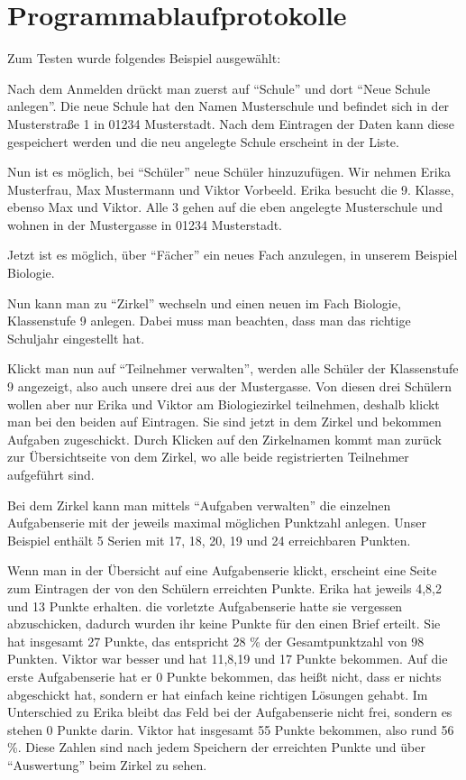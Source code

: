 \chapter{Programmablaufprotokolle}

Zum Testen wurde folgendes Beispiel ausgewählt:

Nach dem Anmelden drückt man zuerst auf "`Schule"' und dort "`Neue Schule anlegen"'. Die neue Schule hat den Namen Musterschule und befindet sich in der Musterstraße 1 in 01234 Musterstadt. Nach dem Eintragen der Daten kann diese gespeichert werden und die neu angelegte Schule erscheint in der Liste. 

Nun ist es möglich, bei "`Schüler"' neue Schüler hinzuzufügen. Wir nehmen Erika Musterfrau, Max Mustermann und Viktor Vorbeeld. Erika besucht die 9. Klasse, ebenso Max und Viktor. Alle 3 gehen auf die eben angelegte Musterschule und wohnen in der Mustergasse in 01234 Musterstadt. 

Jetzt ist es möglich, über "`Fächer"' ein neues Fach anzulegen, in unserem Beispiel Biologie. 

Nun kann man zu "`Zirkel"' wechseln und einen neuen im Fach Biologie, Klassenstufe 9 anlegen. Dabei muss man beachten, dass man das richtige Schuljahr eingestellt hat.

Klickt man nun auf "`Teilnehmer verwalten"', werden alle Schüler der Klassenstufe 9 angezeigt, also auch unsere drei aus der Mustergasse. Von diesen drei Schülern wollen aber nur Erika und Viktor am Biologiezirkel teilnehmen, deshalb klickt man bei den beiden auf Eintragen. Sie sind jetzt in dem Zirkel und bekommen Aufgaben zugeschickt. Durch Klicken auf den Zirkelnamen kommt man zurück zur Übersichtseite von dem Zirkel, wo alle beide registrierten Teilnehmer aufgeführt sind.

Bei dem Zirkel kann man mittels "`Aufgaben verwalten"' die einzelnen Aufgabenserie mit der jeweils maximal möglichen Punktzahl anlegen. Unser Beispiel enthält 5 Serien mit 17, 18, 20, 19 und 24 erreichbaren Punkten. 

Wenn man in der Übersicht auf eine Aufgabenserie klickt, erscheint eine Seite zum Eintragen der von den Schülern erreichten Punkte. Erika hat jeweils 4,8,2 und 13 Punkte erhalten. die vorletzte Aufgabenserie hatte sie vergessen abzuschicken, dadurch wurden ihr keine Punkte für den einen Brief erteilt. Sie hat insgesamt 27 Punkte, das entspricht 28 \% der Gesamtpunktzahl von 98 Punkten. Viktor war besser und hat 11,8,19 und 17 Punkte bekommen. Auf die erste Aufgabenserie hat er 0 Punkte bekommen, das heißt nicht, dass er nichts abgeschickt hat, sondern er hat einfach keine richtigen Lösungen gehabt. Im Unterschied zu Erika bleibt das Feld bei der Aufgabenserie nicht frei, sondern es stehen 0 Punkte darin. Viktor hat insgesamt 55 Punkte bekommen, also rund 56 \%. Diese Zahlen sind nach jedem Speichern der erreichten Punkte und über "`Auswertung"' beim Zirkel zu sehen.

